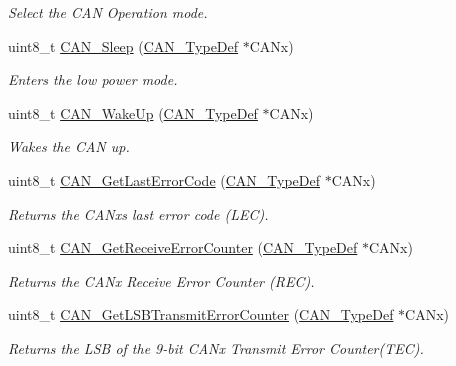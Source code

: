 \begin{DoxyCompactItemize}
\begin{DoxyCompactList}\small\item\em Select the C\+AN Operation mode. \end{DoxyCompactList}\item 
uint8\+\_\+t \mbox{\hyperlink{group___c_a_n___private___functions_ga640215e38765759d7eceb8a039046667}{C\+A\+N\+\_\+\+Sleep}} (\mbox{\hyperlink{struct_c_a_n___type_def}{C\+A\+N\+\_\+\+Type\+Def}} $\ast$C\+A\+Nx)
\begin{DoxyCompactList}\small\item\em Enters the low power mode. \end{DoxyCompactList}\item 
uint8\+\_\+t \mbox{\hyperlink{group___c_a_n___private___functions_ga78cdfbf1884b9e33c552bcbca15bed10}{C\+A\+N\+\_\+\+Wake\+Up}} (\mbox{\hyperlink{struct_c_a_n___type_def}{C\+A\+N\+\_\+\+Type\+Def}} $\ast$C\+A\+Nx)
\begin{DoxyCompactList}\small\item\em Wakes the C\+AN up. \end{DoxyCompactList}\item 
uint8\+\_\+t \mbox{\hyperlink{group___c_a_n___private___functions_gaaee721a392b6b21bfd15dc160aeb6924}{C\+A\+N\+\_\+\+Get\+Last\+Error\+Code}} (\mbox{\hyperlink{struct_c_a_n___type_def}{C\+A\+N\+\_\+\+Type\+Def}} $\ast$C\+A\+Nx)
\begin{DoxyCompactList}\small\item\em Returns the C\+A\+Nx\textquotesingle{}s last error code (L\+EC). \end{DoxyCompactList}\item 
uint8\+\_\+t \mbox{\hyperlink{group___c_a_n___private___functions_ga6903eecbec40eb1361d915ddde9a3274}{C\+A\+N\+\_\+\+Get\+Receive\+Error\+Counter}} (\mbox{\hyperlink{struct_c_a_n___type_def}{C\+A\+N\+\_\+\+Type\+Def}} $\ast$C\+A\+Nx)
\begin{DoxyCompactList}\small\item\em Returns the C\+A\+Nx Receive Error Counter (R\+EC). \end{DoxyCompactList}\item 
uint8\+\_\+t \mbox{\hyperlink{group___c_a_n___private___functions_ga85ee0c35bf7ca15d4e4c862eef534843}{C\+A\+N\+\_\+\+Get\+L\+S\+B\+Transmit\+Error\+Counter}} (\mbox{\hyperlink{struct_c_a_n___type_def}{C\+A\+N\+\_\+\+Type\+Def}} $\ast$C\+A\+Nx)
\begin{DoxyCompactList}\small\item\em Returns the L\+SB of the 9-\/bit C\+A\+Nx Transmit Error Counter(\+T\+E\+C). \end{DoxyCompactList}\item 

\end{DoxyCompactItemize}

